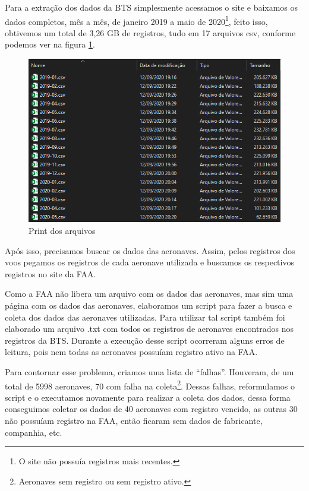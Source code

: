 \documentclass{article}
\begin{document}
	Para a extração dos dados da BTS simplesmente acessamos o site e baixamos os dados completos, mês a mês, de janeiro 2019 a maio de 2020\footnote{O site não possuía registros mais recentes.}, feito isso, obtivemos um total de 3,26 GB de registros, tudo em 17 arquivos csv, conforme podemos ver na figura \ref{print}.
	\begin{figure}[H]
		\centering
		\includegraphics[scale = 0.5]{Imagens/Arquivos.png}
		\caption{Print dos arquivos}
		\label{print}
	\end{figure}
	
	Após isso, precisamos buscar os dados das aeronaves. Assim, pelos registros dos voos pegamos os registros de cada aeronave utilizada e buscamos os respectivos registros no site da FAA.
	
	Como a FAA não libera um arquivo com os dados das aeronaves, mas sim uma página com os dados das aeronaves, elaboramos um script para fazer a busca e coleta dos dados das aeronaves utilizadas. Para utilizar tal script também foi elaborado um arquivo .txt com todos os registros de aeronaves encontrados nos registros da BTS. Durante a execução desse script ocorreram alguns erros de leitura, pois nem todas as aeronaves possuíam registro ativo na FAA.
	
	Para contornar esse problema, criamos uma lista de ``falhas''. Houveram, de um total de 5998 aeronaves, 70 com falha na coleta\footnote{Aeronaves sem registro ou sem registro ativo.}. Dessas falhas, reformulamos o script e o executamos novamente para realizar a coleta dos dados, dessa forma conseguimos coletar os dados de 40 aeronaves com registro vencido, as outras 30 não possuíam registro na FAA, então ficaram sem dados de fabricante, companhia, etc.
	
\end{document}
